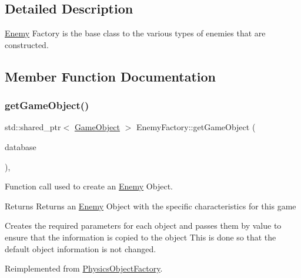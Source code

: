\subsection{Detailed Description}
\hyperlink{class_enemy}{Enemy} Factory is the base class to the various types of enemies that are constructed. 

\subsection{Member Function Documentation}
\mbox{\label{class_enemy_factory_acb6ad18d5ef69a27927907fa9a444c7d}} 
\subsubsection{\texorpdfstring{get\+Game\+Object()}{getGameObject()}}
{\footnotesize\ttfamily std\+::shared\+\_\+ptr$<$ \hyperlink{class_game_object}{Game\+Object} $>$ Enemy\+Factory\+::get\+Game\+Object (\begin{DoxyParamCaption}\item[{const std\+::shared\+\_\+ptr$<$ \hyperlink{class_database_interface}{Database\+Interface} $>$ \&}]{database }\end{DoxyParamCaption})\hspace{0.3cm}{\ttfamily [final]}, {\ttfamily [virtual]}}



Function call used to create an \hyperlink{class_enemy}{Enemy} Object. 

\begin{DoxyReturn}{Returns}
Returns an \hyperlink{class_enemy}{Enemy} Object with the specific characteristics for this game
\end{DoxyReturn}
Creates the required parameters for each object and passes them by value to ensure that the information is copied to the object This is done so that the default object information is not changed. 

Reimplemented from \hyperlink{class_physics_object_factory_a2644107d0c455c3307559cd824a7c9a8}{Physics\+Object\+Factory}.

\mbox{\label{class_enemy_factory_ae064082d650e676960cb84ebb60ba216}} 
